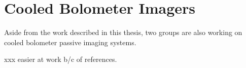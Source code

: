% 

\section{Cooled Bolometer Imagers}

Aside from the work described in this thesis, two groups are also working on cooled bolometer passive imaging systems.

xxx easier at work b/c of references.
